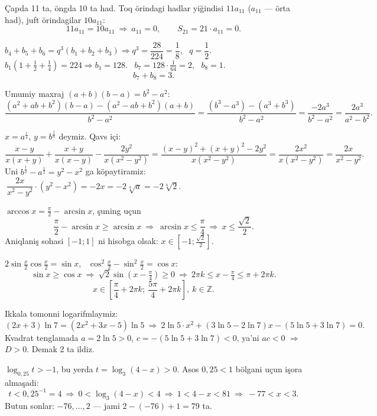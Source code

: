 Çapda 11 ta, öngda 10 ta had. Toq örindagi hadlar yiğindisi $11a_{11}$ ($a_{11}$ — örta had), juft örindagilar $10a_{11}$:
\[11a_{11}=10a_{11}\ \Rightarrow\ a_{11}=0,\qquad S_{21}=21\cdot a_{11}=0.\]

$b_4+b_5+b_6=q^3(b_1+b_2+b_3)\Rightarrow q^3=\dfrac{28}{224}=\dfrac18$, \ $q=\dfrac12$.\\
$b_1\left(1+\frac12+\frac14\right)=224\Rightarrow b_1=128$. \ $b_7=128\cdot\frac1{64}=2$, \ $b_8=1$.
\[b_7+b_8=3.\]

Umumiy maxraj $(a+b)(b-a)=b^2-a^2$:
\[\frac{(a^2+ab+b^2)(b-a)-(a^2-ab+b^2)(a+b)}{b^2-a^2}=\frac{(b^3-a^3)-(a^3+b^3)}{b^2-a^2}=\frac{-2a^3}{b^2-a^2}=\frac{2a^3}{a^2-b^2}.\]

$x=a^{\frac14}$, $y=b^{\frac14}$ deymiz. Qavs içi:
\[\frac{x-y}{x(x+y)}+\frac{x+y}{x(x-y)}-\frac{2y^2}{x(x^2-y^2)}=\frac{(x-y)^2+(x+y)^2-2y^2}{x(x^2-y^2)}=\frac{2x^2}{x(x^2-y^2)}=\frac{2x}{x^2-y^2}.\]
Uni $b^{\frac12}-a^{\frac12}=y^2-x^2$ ga köpaytiramiz: $\ \dfrac{2x}{x^2-y^2}\cdot(y^2-x^2)=-2x=-2\sqrt[4]{a}=-2\sqrt[4]2.$

$\arccos x=\frac\pi2-\arcsin x$, şuning uçun
\[\frac\pi2-\arcsin x\ge\arcsin x\ \Rightarrow\ \arcsin x\le\frac\pi4\ \Rightarrow\ x\le\frac{\sqrt2}2.\]
Aniqlaniş sohasi $[-1;1]$ ni hisobga olsak: $x\in\left[-1;\frac{\sqrt2}2\right]$.

$2\sin\frac x2\cos\frac x2=\sin x$, \ $\cos^2\frac x2-\sin^2\frac x2=\cos x$:
\[\sin x\ge\cos x\ \Rightarrow\ \sqrt2\sin\!\left(x-\tfrac\pi4\right)\ge0\ \Rightarrow\ 2\pi k\le x-\tfrac\pi4\le\pi+2\pi k.\]
\[x\in\left[\frac\pi4+2\pi k;\ \frac{5\pi}4+2\pi k\right],\ k\in\mathbb Z.\]

Ikkala tomonni logarifmlaymiz:
\[(2x+3)\ln7=(2x^2+3x-5)\ln5\ \Rightarrow\ 2\ln5\cdot x^2+(3\ln5-2\ln7)x-(5\ln5+3\ln7)=0.\]
Kvadrat tenglamada $a=2\ln5>0$, $c=-(5\ln5+3\ln7)<0$, ya'ni $ac<0$ $\Rightarrow$ $D>0$. Demak 2 ta ildiz.

$\log_{0{,}25}t>-1$, bu yerda $t=\log_3(4-x)>0$. Asos $0{,}25<1$ bölgani uçun işora almaşadi:
\[t<0{,}25^{-1}=4\ \Rightarrow\ 0<\log_3(4-x)<4\ \Rightarrow\ 1<4-x<81\ \Rightarrow\ -77<x<3.\]
Butun sonlar: $-76,\dots,2$ — jami $2-(-76)+1=79$ ta.


